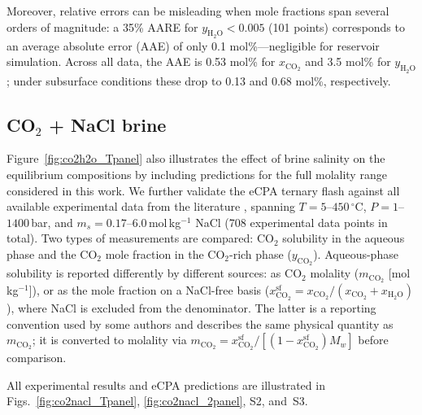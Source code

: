 \documentclass[preprint,12pt,number]{elsarticle}
\begin{document}
Moreover, relative errors can be misleading when mole fractions span several orders of
magnitude: a 35\% AARE for $y_{\text{H}_2\text{O}} < 0.005$ (101 points) corresponds to an
average absolute error (AAE) of only 0.1 mol\%---negligible for reservoir
simulation.  Across all data, the AAE is 0.53 mol\% for $x_{\text{CO}_2}$ and
3.5 mol\% for $y_{\text{H}_2\text{O}}$; under subsurface conditions these drop to
0.13 and 0.68 mol\%, respectively.






\subsection{CO$_2$ + NaCl brine}
\label{sec:co2nacl}

Figure~\ref{fig:co2h2o_Tpanel} also illustrates the effect of brine salinity on the equilibrium compositions by including predictions for the full molality range considered in this work. 
We further validate the eCPA ternary flash against all available experimental data from the
literature \citep{Guo2015, Rumpf1994, Koschel2006, Kiepe2002, Takenouchi1965,
Chabab2020, Messabeb2016, Hou2013, Yan2011, Zhao2015,
Bando2003, Nighswander1989, Liu2021, Liu2011b, Savary2012},
spanning $T = 5$--$450\,^\circ$C, $P = 1$--$1400$\,bar, and
$m_s = 0.17$--$6.0$\,mol\,kg$^{-1}$ NaCl (708 experimental data points in total).
Two types of measurements are compared: CO$_2$ solubility in the aqueous
phase and the CO$_2$ mole fraction in the CO$_2$-rich phase
($y_{\text{CO}_2}$).
Aqueous-phase solubility is reported differently by different sources:
as CO$_2$ molality ($m_{\text{CO}_2}$ [mol\,kg$^{-1}$]), or as the mole fraction
on a NaCl-free basis
($x_{\text{CO}_2}^{\text{sf}} = x_{\text{CO}_2}/(x_{\text{CO}_2}+x_{\text{H}_2\text{O}})$),
where NaCl is excluded from the denominator.
The latter is a reporting convention used by some authors and describes
the same physical quantity as $m_{\text{CO}_2}$; it is converted to molality via
$m_{\text{CO}_2} = x_{\text{CO}_2}^{\text{sf}}/[(1-x_{\text{CO}_2}^{\text{sf}})M_w]$
before comparison.






All experimental results and eCPA predictions are illustrated in Figs.~\ref{fig:co2nacl_Tpanel}, \ref{fig:co2nacl_2panel}, S2, and~S3.
\end{document}
